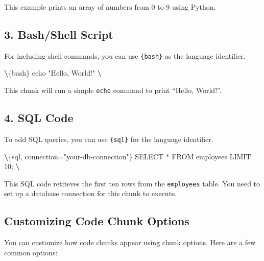 \documentclass[
]{book}
\newenvironment{Shaded}{\begin{snugshade}}{\end{snugshade}}
\newcommand{\NormalTok}[1]{#1}
\newcommand{\SpecialCharTok}[1]{\textcolor[rgb]{0.81,0.36,0.00}{\textbf{#1}}}
\theoremstyle{definition}
\theoremstyle{definition}
\theoremstyle{definition}
\theoremstyle{definition}
\theoremstyle{remark}
\begin{document}
This example prints an array of numbers from 0 to 9 using Python.

\subsection{3. Bash/Shell Script}\label{bashshell-script}

For including shell commands, you can use \texttt{\{bash\}} as the language identifier.

\begin{Shaded}
\begin{Highlighting}[]
\SpecialCharTok{\textbackslash{}\textasciigrave{}}\NormalTok{\textasciigrave{}\textasciigrave{}\{bash\}}
\NormalTok{echo "Hello, World!"}
\SpecialCharTok{\textbackslash{}\textasciigrave{}}\NormalTok{\textasciigrave{}\textasciigrave{}}
\end{Highlighting}
\end{Shaded}

This chunk will run a simple \texttt{echo} command to print ``Hello, World!''.

\subsection{4. SQL Code}\label{sql-code}

To add SQL queries, you can use \texttt{\{sql\}} for the language identifier.

\begin{Shaded}
\begin{Highlighting}[]
\SpecialCharTok{\textbackslash{}\textasciigrave{}}\NormalTok{\textasciigrave{}\textasciigrave{}\{sql, connection="your{-}db{-}connection"\}}
\NormalTok{SELECT * FROM employees LIMIT 10;}
\SpecialCharTok{\textbackslash{}\textasciigrave{}}\NormalTok{\textasciigrave{}\textasciigrave{}}
\end{Highlighting}
\end{Shaded}

This SQL code retrieves the first ten rows from the \texttt{employees} table. You need to set up a database connection for this chunk to execute.

\subsection{Customizing Code Chunk Options}\label{customizing-code-chunk-options}

You can customize how code chunks appear using chunk options. Here are a few common options:
\end{document}
